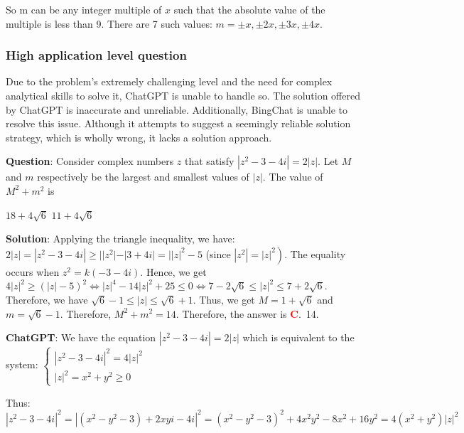 \documentclass{article}
\begin{document}
{\begin{mdframed}[linewidth=1pt,linecolor=red]
		So m can be any integer multiple of $x$ such that the absolute value of the multiple is less than 9. There are 7 such values: $m = \pm x, \pm 2x, \pm 3x, \pm 4x$.
		
	\end{mdframed}
	
	\subsubsection{High application level question}
	\label{VNHSGE_Math_H}
	
	Due to the problem's extremely challenging level and the need for complex analytical skills to solve it, ChatGPT is unable to handle so. The solution offered by ChatGPT is inaccurate and unreliable. Additionally, BingChat is unable to resolve this issue. Although it attempts to suggest a seemingly reliable solution strategy, which is wholly wrong, it lacks a solution approach.
	
	
	
	\begin{mdframed}[linewidth=1pt,linecolor=red]
		\textbf{Question}: Consider complex numbers $z$ that satisfy $|z^2 - 3 - 4i| = 2|z|$. Let $M$ and $m$ respectively be the largest and smallest values of $|z|$. The value of  $M^2+m^2$ is
		
		\begin{oneparchoices}
			\choice $18+4\sqrt{6}$
			\choice $11+4\sqrt{6}$
		\end{oneparchoices}
		
		\textbf{Solution}:
		Applying the triangle inequality, we have: 
		$2|z|=\left|z^{2}-3-4 i\right| \geq|| z^{2}|-| 3+4 i|=||z|^{2}-5$
		(since $\left.\left|z^{2}\right|=|z|^{2}\right)$. The equality occurs when $z^{2}=k(-3-4 i)$. Hence, we get $4|z|^{2} \geq(|z|-5)^{2} \Leftrightarrow|z|^{4}-14|z|^{2}+25 \leq 0 \Leftrightarrow 7-2 \sqrt{6} \leq|z|^{2} \leq 7+2 \sqrt{6}$. Therefore, we have $\sqrt{6}-1 \leq|z| \leq \sqrt{6}+1$. Thus, we get $M=1+\sqrt{6}$ and $m=\sqrt{6}-1$. Therefore, $M^{2}+m^{2}=14$. Therefore, the answer is \textcolor{red}{\textbf{C}}.~14.
		
		\textbf{ChatGPT}: We have the equation $|z^2 - 3 - 4i| = 2|z|$ which is equivalent to the system:
		$\left\{\begin{matrix}
			|z^2 - 3 - 4i|^2 = 4|z|^2 \\
			|z|^2 = x^2 + y^2 \geq 0
		\end{matrix}\right. $
		
		Thus:
		$|z^2 - 3 - 4i|^2 = |(x^2-y^2-3) + 2xyi - 4i|^2 = (x^2-y^2-3)^2 + 4x^2y^2 - 8x^2 + 16y^2 = 4(x^2+y^2)|z|^2$
		

\end{mdframed}}
\end{document}
